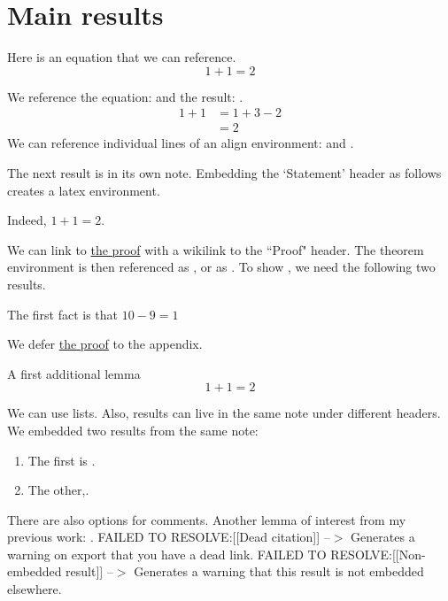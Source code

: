 \documentclass{article}
\begin{document}
\section{Main results}
\label{loc:body.main_results}
Here is an equation that we can reference.
\begin{equation}
\label{eq:main}
1+1 = 2
\end{equation}
\begin{lemma}
\label{lem:explicit}
We reference the equation:  and the result: .
\begin{align}
1+1 & = 1+3-2 \label{eq:aligned_eq:1}\\
& = 2 \label{eq:aligned_eq:2}
\end{align}
We can reference individual lines of an align environment:  and .
\end{lemma}
The next result is in its own note. Embedding the `Statement' header as follows creates a latex environment.
\begin{theorem}
\label{loc:theorem_1.statement}
Indeed, $1+1  =  2$.
\end{theorem}
We can link to \hyperlink{loc:theorem_1.proof}{the proof} with a wikilink to the ``Proof" header.
The theorem environment is then referenced as , or as . To show , we need the following two results.
\begin{lemma}
\label{loc:lemma_1.statement}
The first fact is that $10-9 = 1$
\end{lemma}
We defer \hyperlink{loc:lemma_1.proof}{the proof} to the appendix.
\begin{lemma}
\label{loc:other_small_lemmas.first_other_lemma}
A first additional lemma
\begin{equation*}
1+1 = 2
\end{equation*}
\end{lemma}
We can use lists. Also, results can live in the same note under different headers. We embedded two results from the same note: 
\begin{enumerate}
\item The first is .
\item The other,.
\end{enumerate}

There are also options for comments.
Another lemma of interest from my previous work: \cite[Proposition 3.1]{scottpaper}.
FAILED TO RESOLVE:[[Dead citation]] --$>$ Generates a warning on export that you have a dead link.
FAILED TO RESOLVE:[[Non-embedded result]] --$>$ Generates a warning that this result is not embedded elsewhere.
\end{document}

